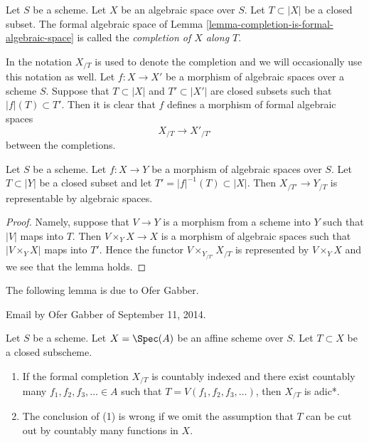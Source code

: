 \begin{definition}
\label{definition-completion}
Let $S$ be a scheme. Let $X$ be an algebraic space over $S$.
Let $T \subset |X|$ be a closed subset. The formal algebraic space
of Lemma \ref{lemma-completion-is-formal-algebraic-space}
is called the {\it completion of $X$ along $T$}.
\end{definition}

\noindent
In \cite[Chapter I, Section 10.8]{EGA} the notation $X_{/T}$
is used to denote the completion and we will occasionally use
this notation as well. Let $f : X \to X'$ be
a morphism of algebraic spaces over a scheme $S$. Suppose
that $T \subset |X|$ and $T' \subset |X'|$ are closed subsets
such that $|f|(T) \subset T'$. Then it is clear that
$f$ defines a morphism of formal algebraic spaces
$$
X_{/T} \longrightarrow X'_{/T'}
$$
between the completions.

\begin{lemma}
\label{lemma-map-completions-representable}
Let $S$ be a scheme. Let $f : X \to Y$ be a morphism
of algebraic spaces over $S$. Let $T \subset |Y|$
be a closed subset and let $T' = |f|^{-1}(T) \subset |X|$.
Then $X_{/T'} \to Y_{/T}$ is representable by algebraic spaces.
\end{lemma}

\begin{proof}
Namely, suppose that $V \to Y$ is a morphism from a scheme into $Y$ such
that $|V|$ maps into $T$. Then $V \times_Y X \to X$ is a morphism of
algebraic spaces such that $|V \times_Y X|$ maps into $T'$. Hence the
functor $V \times_{Y_{/T'}} X_{/T}$ is represented by $V \times_Y X$
and we see that the lemma holds.
\end{proof}

\noindent
The following lemma is due to Ofer Gabber.

\begin{lemma}
\label{lemma-completion-countably-indexed}
\begin{reference}
Email by Ofer Gabber of September 11, 2014.
\end{reference}
Let $S$ be a scheme. Let $X = \Spec(A)$ be an affine scheme over $S$.
Let $T \subset X$ be a closed subscheme.
\begin{enumerate}
\item If the formal completion $X_{/T}$ is countably indexed
and there exist countably many $f_1, f_2, f_3, \ldots \in A$ such that
$T = V(f_1, f_2, f_3, \ldots)$, then $X_{/T}$ is adic*.
\item The conclusion of (1) is wrong if we omit the assumption that
$T$ can be cut out by countably many functions in $X$.
\end{enumerate}
\end{lemma}

